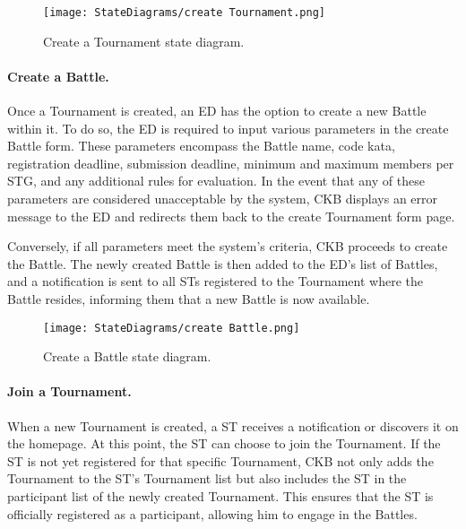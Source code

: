 \begin{figure}[H]
    \begin{center}
        \texttt{[image: StateDiagrams/create Tournament.png]}
        \caption{Create a Tournament state diagram.}
        \label{fig:create_Tournament_sd}%
    \end{center}
\end{figure}

\paragraph{Create a Battle.}
Once a Tournament is created, an ED has the option to create a new Battle within it. To do so, the ED is required to input various parameters in the create Battle form. These parameters encompass the Battle name, code kata, registration deadline, submission deadline, minimum and maximum members per STG, and any additional rules for evaluation. In the event that any of these parameters are considered unacceptable by the system, CKB displays an error message to the ED and redirects them back to the create Tournament form page.

Conversely, if all parameters meet the system's criteria, CKB proceeds to create the Battle. The newly created Battle is then added to the ED's list of Battles, and a notification is sent to all STs registered to the Tournament where the Battle resides, informing them that a new Battle is now available.

\begin{figure}[H]
    \begin{center}
        \texttt{[image: StateDiagrams/create Battle.png]}
        \caption{Create a Battle state diagram.}
        \label{fig:create_Battle_sd}%
    \end{center}
\end{figure}

\paragraph{Join a Tournament.}
When a new Tournament is created, a ST receives a notification or discovers it on the homepage. At this point, the ST can choose to join the Tournament. If the ST is not yet registered for that specific Tournament, CKB not only adds the Tournament to the ST's Tournament list but also includes the ST in the participant list of the newly created Tournament. This ensures that the ST is officially registered as a participant, allowing him to engage in the Battles.

